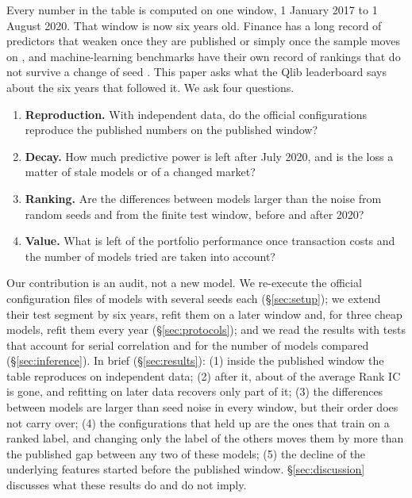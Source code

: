 \documentclass[11pt]{article}
\begin{document}
Every number in the table is computed on one window, 1 January 2017 to 1 August 2020.
That window is now six years old.
Finance has a long record of predictors that weaken once they are published or simply once the sample moves on \citep{mclean2016does,falck2022decay,harvey2016cross,jensen2023replication}, and machine-learning benchmarks have their own record of rankings that do not survive a change of seed \citep{henderson2018deep,bouthillier2021accounting}.
This paper asks what the Qlib leaderboard says about the six years that followed it.
We ask four questions.

\begin{enumerate}
\item \textbf{Reproduction.} With independent data, do the official configurations reproduce the published numbers on the published window?
\item \textbf{Decay.} How much predictive power is left after July 2020, and is the loss a matter of stale models or of a changed market?
\item \textbf{Ranking.} Are the differences between models larger than the noise from random seeds and from the finite test window, before and after 2020?
\item \textbf{Value.} What is left of the portfolio performance once transaction costs and the number of models tried are taken into account?
\end{enumerate}

Our contribution is an audit, not a new model.
We re-execute the official configuration files of \NModels{} models with several seeds each (\S\ref{sec:setup}); we extend their test segment by six years, refit them on a later window and, for three cheap models, refit them every year (\S\ref{sec:protocols}); and we read the results with tests that account for serial correlation and for the number of models compared (\S\ref{sec:inference}).
In brief (\S\ref{sec:results}):
(1) inside the published window the table reproduces on independent data;
(2) after it, about \MeanDecayPct{} of the average Rank IC is gone, and refitting on later data recovers only part of it;
(3) the differences between models are larger than seed noise in every window, but their order does not carry over;
(4) the configurations that held up are the ones that train on a ranked label, and changing only the label of the others moves them by more than the published gap between any two of these models;
(5) the decline of the underlying features started before the published window.
\S\ref{sec:discussion} discusses what these results do and do not imply.
\end{document}
